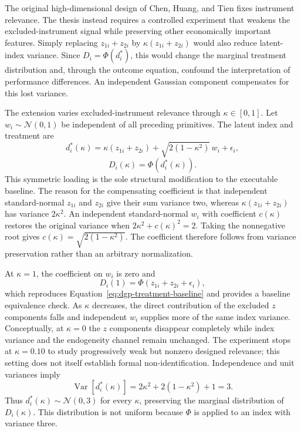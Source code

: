 The original high-dimensional design of Chen, Huang, and Tien fixes instrument relevance. The thesis instead requires a controlled experiment that weakens the excluded-instrument signal while preserving other economically important features. Simply replacing $z_{1i}+z_{2i}$ by $\kappa(z_{1i}+z_{2i})$ would also reduce latent-index variance. Since $D_i=\Phi(d_i^*)$, this would change the marginal treatment distribution and, through the outcome equation, confound the interpretation of performance differences. An independent Gaussian component compensates for this lost variance.

The extension varies excluded-instrument relevance through $\kappa\in[0,1]$. Let $w_i\sim\mathcal{N}(0,1)$ be independent of all preceding primitives. The latent index and treatment are
\begin{equation}
  d_i^*(\kappa)
  =\kappa(z_{1i}+z_{2i})
  +\sqrt{2(1-\kappa^2)}\,w_i
  +\epsilon_i,
  \label{eq:dgp-kappa-index}
\end{equation}
\begin{equation}
  D_i(\kappa)=\Phi\!\left(d_i^*(\kappa)\right).
  \label{eq:dgp-treatment-kappa}
\end{equation}
This symmetric loading is the sole structural modification to the executable baseline. The reason for the compensating coefficient is that independent standard-normal $z_{1i}$ and $z_{2i}$ give their sum variance two, whereas $\kappa(z_{1i}+z_{2i})$ has variance $2\kappa^2$. An independent standard-normal $w_i$ with coefficient $c(\kappa)$ restores the original variance when $2\kappa^2+c(\kappa)^2=2$. Taking the nonnegative root gives $c(\kappa)=\sqrt{2(1-\kappa^2)}$. The coefficient therefore follows from variance preservation rather than an arbitrary normalization.

At $\kappa=1$, the coefficient on $w_i$ is zero and
\begin{equation}
  D_i(1)=\Phi(z_{1i}+z_{2i}+\epsilon_i),
  \label{eq:dgp-kappa-baseline}
\end{equation}
which reproduces Equation~\eqref{eq:dgp-treatment-baseline} and provides a baseline equivalence check. As $\kappa$ decreases, the direct contribution of the excluded $z$ components falls and independent $w_i$ supplies more of the same index variance. Conceptually, at $\kappa=0$ the $z$ components disappear completely while index variance and the endogeneity channel remain unchanged. The experiment stops at $\kappa=0.10$ to study progressively weak but nonzero designed relevance; this setting does not itself establish formal non-identification. Independence and unit variances imply
\begin{equation}
  \operatorname{Var}\!\left[d_i^*(\kappa)\right]
  =2\kappa^2+2(1-\kappa^2)+1=3.
  \label{eq:dgp-kappa-variance}
\end{equation}
Thus $d_i^*(\kappa)\sim\mathcal{N}(0,3)$ for every $\kappa$, preserving the marginal distribution of $D_i(\kappa)$. This distribution is not uniform because $\Phi$ is applied to an index with variance three.

